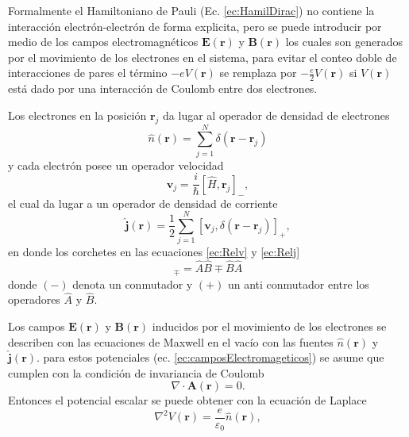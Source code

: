 \par Formalmente el Hamiltoniano de Pauli (Ec. \ref{ec:HamilDirac}) no contiene la interacci\'on electr\'on-electr\'on de forma explicita,  pero se puede introducir  por medio de los campos electromagn\'eticos $\pmb{E} (\pmb{r})$ y $\pmb{B} (\pmb{r})$ los cuales son generados por el movimiento de los electrones en el sistema, para evitar el conteo doble de interacciones de pares el t\'ermino $-e V (\pmb{r})$ se remplaza por $-\frac{e}{2} V(\pmb{r})$ si $V (\pmb{r})$ est\'a dado por  una interacci\'on de Coulomb entre dos electrones.
\newline
\par Los electrones en la posici\'on $\pmb{r}_j$ da lugar al operador de densidad de electrones \cite{MB-2015}
\begin{equation}
	\hat{n} (\pmb{r}) = \sum_{j=1}^{N} \delta (\pmb{r}- \pmb{r}_j) \label{ec:Reln}
\end{equation}
y cada electr\'on posee un operador velocidad
\begin{equation}
	\pmb{v}_j = \frac{i}{\hbar} [\hat{H},\pmb{r}_j]_- \label{ec:Relv},
\end{equation}
el cual da lugar a un operador de densidad de corriente
\begin{equation}
	\hat{\pmb{j}} (\pmb{r}) = \frac{1}{2} \sum_{j=1}^{N} [\pmb{v}_j, \delta (\pmb{r}-\pmb{r}_j)]_+ , \label{ec:Relj}
\end{equation}
en donde los corchetes en las ecuaciones \ref{ec:Relv} y \ref{ec:Relj} \cite{Martin-2004}
\begin{equation}
	[\hat{A},\hat{B}]_{\mp} = \hat{A} \hat{B} \mp \hat{B} \hat{A} \label{ec:conm}
\end{equation} 
donde $(-)$ denota un conmutador y  $(+)$ un anti conmutador entre los operadores $\hat{A}$ y $\hat{B}$.
\newline
\par Los campos  $\pmb{E} (\pmb{r})$ y $\pmb{B} (\pmb{r})$ inducidos por el movimiento de los electrones se describen con las ecuaciones de Maxwell en el vac\'io con las fuentes $\hat{n} (\pmb{r})$ y $\pmb{\hat{j}} (\pmb{r})$. para estos potenciales (ec. \ref{ec:camposElectromageticos}) se asume que cumplen con la condici\'on de invariancia de Coulomb \cite{MB-2015}
\begin{equation}
	\nabla \cdot \pmb{A} (\pmb{r}) = 0. \label{ec:CoulombGauge}
\end{equation}
Entonces el potencial escalar se puede obtener con la ecuaci\'on de Laplace \cite{Jackson-1975}
\begin{equation}
	\nabla^2 V(\pmb{r}) = \frac{e}{\varepsilon_0} \hat{n} (\pmb{r}), \label{ec:poisson}
\end{equation}
